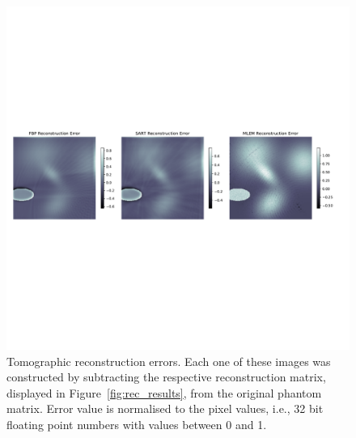 \begin{figure}[t]
    \centering
    \includegraphics[clip, trim=.5cm 13.5cm 1.5cm 13cm,
    width=\textwidth]{img/pdf/rec_error_compilation_1.pdf}
    \caption{Tomographic reconstruction errors. Each one of these images
    was constructed by subtracting the respective reconstruction matrix,
    displayed in Figure~\ref{fig:rec_results}, from the original phantom
    matrix. Error value is normalised to the pixel values, i.e., 32 bit
    floating point numbers with values between 0 and 1.}
    \label{fig:rec_errors}
\end{figure}

